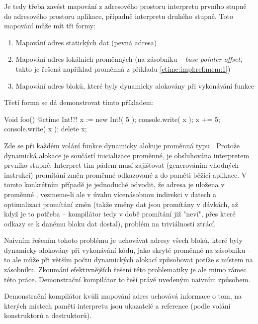 Je tedy třeba zavést mapování z adresového prostoru interpretu prvního stupně do adresového prostoru aplikace, případně interpretu druhého stupně. Toto mapování může mít tři formy:
\begin{enumerate}
	\item Mapování adres statických dat (pevná adresa)
	\item Mapování adres lokálních proměnných (na zásobníku -- \textit{base pointer offset}, takto je řešená například proměnná  z příkladu \ref{ctime:impl:ref:mem:1})
	\item Mapování adres \ctime bloků, které byly dynamicky alokovány při vykonávání \nonctime funkce
\end{enumerate}

Třetí forma se dá demonstrovat tímto příkladem:

\begin{code}
Void foo() {
	@ctime Int!?! x := new Int!( 5 );
	console.write( x );
	x += 5;
	console.write( x );
	delete x;
}
\end{code}

Zde se při každém volání funkce  dynamicky alokuje proměnná typu . Protože dynamická alokace je součástí inicializace \ctime proměnné, je obsluhována interpretem prvního stupně. Interpret tím pádem musí zajišťovat (generováním vhodných instrukcí) promítání změn proměnné odkazované z  do paměti běžící aplikace. V tomto konkrétním případě je jednoduché odvodit, že adresa je uložena v proměnné , vezmeme-li ale v úvahu vícenásobnou indirekci v \ctime datech a optimalizaci promítání změn (takže změny dat jsou promítány v dávkách, až když je to potřeba -- kompilátor tedy v době promítání již "neví", přes které odkazy se k danému bloku dat dostal), problém na triviálnosti ztrácí.

Naivním řešením tohoto problému je uchovávat adresy všech bloků, které byly dynamicky alokovány při vykonávání \ctime kódu, jako skryté proměnné na zásobníku -- to ale může při větším počtu dynamických alokací způsobovat potíže s místem na zásobníku. Zkoumání efektivnějších řešení této problematiky je ale mimo rámec této práce. Demonstrační kompilátor to řeší právě uvedeným naivním způsobem.

Demonstrační kompilátor kvůli mapování adres uchovává informace o tom, na kterých místech paměti interpretu jsou ukazatelé a reference (podle volání konstruktorů a destruktorů). 

